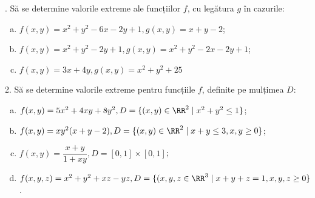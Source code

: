 \indent{}. Să se determine valorile extreme ale funcțiilor $ f $,
cu legătura $ g $ în cazurile:
\begin{enumerate}[(a)]
\item $ f(x, y) = x^2 + y^2 - 6x - 2y + 1, g(x, y) = x + y - 2 $;
\item $ f(x, y) = x^2 + y^2 - 2y + 1, g(x, y) = x^2 + y^2 - 2x - 2y + 1 $;
\item $ f(x, y) = 3x + 4y, g(x, y) = x^2 + y^2 + 25 $
\end{enumerate}

\vspace{1cm}

2. Să se determine valorile extreme pentru funcțiile $ f $, definite pe
mulțimea $ D $:
\begin{enumerate}[(a)]
\item $ f(x, y) = 5x^2 + 4xy + 8y^2, D = \{(x, y) \in \RR^2 \mid x^2 + y^2 \leq 1 \} $;
\item $ f(x, y) = xy^2(x + y - 2), D = \{(x, y) \in \RR^2 \mid x + y \leq 3, x, y \geq 0 \} $;
\item $ f(x, y) = \dfrac{x + y}{1 + xy}, D = [0, 1] \times [0, 1] $;
\item $ f(x, y, z) = x^2 + y^2 + xz - yz, D = \{(x, y, z \in \RR^3 \mid %
  x + y + z = 1, x, y, z \geq 0 \} $.
\end{enumerate}


